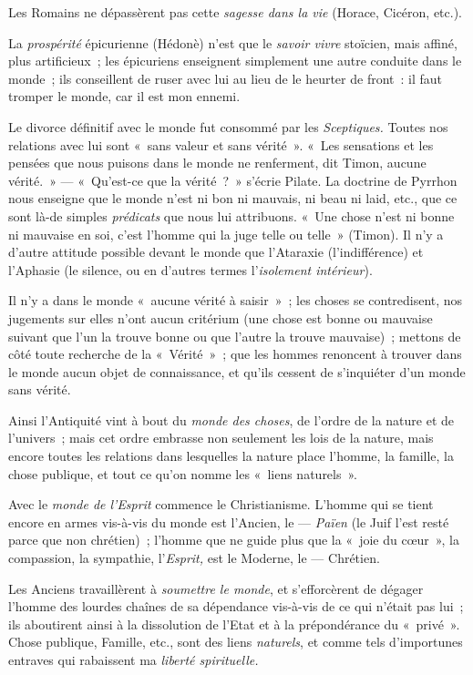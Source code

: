 \documentclass[french,twoside]{book} %
\begin{document}
Les Romains ne dépassèrent pas cette \emph{sagesse dans la vie} (Horace, Cicéron, etc.).\par
La \emph{prospérité} épicurienne (Hédonè) n’est que le \emph{savoir vivre} stoïcien, mais affiné, plus artificieux ; les épicuriens enseignent simplement une autre conduite dans le monde ; ils conseillent de ruser avec lui au lieu de le heurter de front : il faut tromper le monde, car il est mon ennemi.\par
Le divorce définitif avec le monde fut consommé par les \emph{Sceptiques.} Toutes nos relations avec lui sont « sans valeur et sans vérité ». « Les sensations et les pensées que nous puisons dans le monde ne renferment, dit Timon, aucune vérité. » — « Qu’est-ce que la vérité ? » s’écrie Pilate. La doctrine de Pyrrhon nous enseigne que le monde n’est ni bon ni mauvais, ni beau ni laid, etc., que ce sont là-de simples \emph{prédicats }que nous lui attribuons. « Une chose n’est ni bonne ni mauvaise en soi, c’est l’homme qui la juge telle ou telle » (Timon). Il n’y a d’autre attitude possible devant le monde que l’Ataraxie (l’indifférence) et l’Aphasie (le silence, ou en d’autres termes l’\emph{isolement intérieur}).\par
Il n’y a dans le monde « aucune vérité à saisir » ; les choses se contredisent, nos jugements sur elles n’ont aucun critérium (une chose est bonne ou mauvaise suivant que l’un la trouve bonne ou que l’autre la trouve mauvaise) ; mettons de côté toute recherche de la « Vérité » ; que les hommes renoncent à trouver dans le monde aucun objet de connaissance, et qu’ils cessent de s’inquiéter d’un monde sans vérité.\par
Ainsi l’Antiquité vint à bout du \emph{monde des choses}, de l’ordre de la nature et de l’univers ; mais cet ordre embrasse non seulement les lois de la nature, mais encore toutes les relations dans lesquelles la nature place l’homme, la famille, la chose publique, et tout ce qu’on nomme les « liens naturels ».\par
 Avec le \emph{monde de l’Esprit} commence le Christianisme. L’homme qui se tient encore en armes vis-à-vis du monde est l’Ancien, le — \emph{Païen} (le Juif l’est resté parce que non chrétien) ; l’homme que ne guide plus que la « joie du cœur », la compassion, la sympathie, l’\emph{Esprit,} est le Moderne, le — Chrétien.\par
Les Anciens travaillèrent à \emph{soumettre le monde}, et s’efforcèrent de dégager l’homme des lourdes chaînes de sa dépendance vis-à-vis de ce qui n’était pas lui ; ils aboutirent ainsi à la dissolution de l’Etat et à la prépondérance du « privé ». Chose publique, Famille, etc., sont des liens \emph{naturels}, et comme tels d’importunes entraves qui rabaissent ma \emph{liberté spirituelle.}
\end{document}
